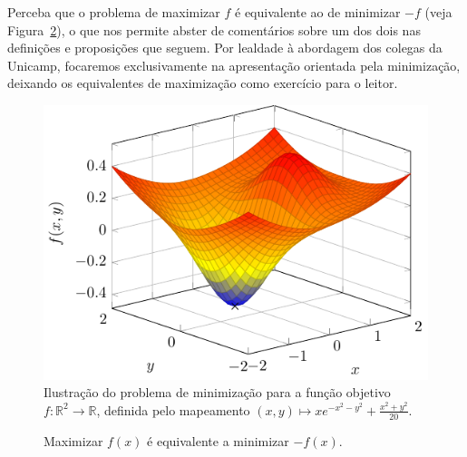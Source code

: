 Perceba que o problema de maximizar $f$ é equivalente ao de minimizar $-f$ (veja Figura~\ref{fig:max_min_equiv}), o que nos permite abster de comentários sobre um dos dois nas definições e proposições que seguem. Por lealdade à abordagem dos colegas da Unicamp, focaremos exclusivamente na apresentação orientada pela minimização, deixando os equivalentes de maximização como exercício para o leitor. 

\begin{figure}[h]
	\centering
	\includegraphics[scale=0.9]{secOtimizacao/figures/solucaoOtima.pdf}
	\caption{Ilustração do problema de minimização para a função objetivo $f:\mathbb{R}^2\to\mathbb{R}$, definida pelo mapeamento $(x,y) \mapsto xe^{-x^2-y^2} + \frac{x^2 + y^2}{20}$.}
	\label{fig:otimizacao}
\end{figure}

\begin{figure}[h]
    \centering
    \caption{Maximizar $f(x)$ é equivalente a minimizar $-f(x)$.}
    \label{fig:max_min_equiv}
\end{figure}
	
